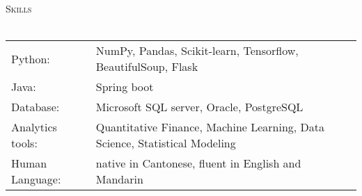 \documentclass[a4paper]{article}
\newcommand{\lineunder} {
    \vspace*{-8pt} \\
    \hspace*{-18pt} \hrulefill \\
}
\newcommand{\header} [1] {
    {\hspace*{-18pt}\vspace*{6pt} \textsc{#1}}
    \vspace*{-6pt} \lineunder
}
\begin{document}
\header{Skills}
\begin{tabular}{ l l }
    Python:          & NumPy, Pandas, Scikit-learn, Tensorflow, BeautifulSoup, Flask                        \\
    Java:            & Spring boot                                                                \\
    Database:        & Microsoft SQL server, Oracle, PostgreSQL                                   \\
    Analytics tools: & Quantitative Finance, Machine Learning, Data Science, Statistical Modeling \\
        Human Language:  & native in Cantonese, fluent in English and Mandarin
\end{tabular}
\vspace{2mm}





\ 
\end{document}

